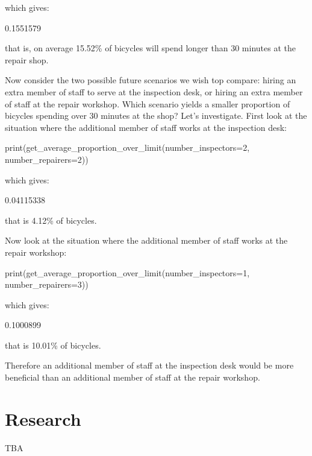 which gives:

\begin{Rout}
[1] 0.1551579
\end{Rout}

that is, on average 15.52\% of bicycles will spend longer than 30 minutes at the
repair shop.

Now consider the two possible future scenarios we wish top compare: hiring an
extra member of staff to serve at the inspection desk, or hiring an extra member
of staff at the repair workshop. Which scenario yields a smaller proportion of
bicycles spending over 30 minutes at the shop? Let's investigate. First look at
the situation where the additional member of staff works at the inspection desk:

\begin{Rin}
print(get_average_proportion_over_limit(number_inspectors=2, number_repairers=2))
\end{Rin}

which gives:

\begin{Rout}
[1] 0.04115338
\end{Rout}

that is 4.12\% of bicycles.

Now look at the situation where the additional member of staff works at the
repair workshop:

\begin{Rin}
print(get_average_proportion_over_limit(number_inspectors=1, number_repairers=3))
\end{Rin}

which gives:

\begin{Rout}
[1] 0.1000899
\end{Rout}

that is 10.01\% of bicycles.

Therefore an additional member of staff at the inspection desk would be more
beneficial than an additional member of staff at the repair workshop.


\section{Research}\label{sec:research}

TBA
